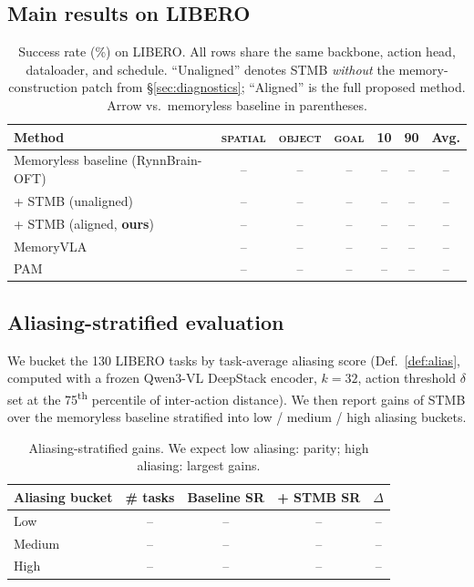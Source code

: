 \documentclass[11pt]{article}
\newcommand{\num}{--} %
\begin{document}
\subsection{Main results on LIBERO}

\begin{table}[h]
\centering
\caption{Success rate (\%) on LIBERO. All rows share the same backbone, action
head, dataloader, and schedule. ``Unaligned'' denotes STMB \emph{without} the
memory-construction patch from \S\ref{sec:diagnostics}; ``Aligned'' is the full
proposed method. Arrow vs.~memoryless baseline in parentheses.}
\label{tab:libero}
\small
\begin{tabular}{lcccccc}
\toprule
Method & \textsc{spatial} & \textsc{object} & \textsc{goal} & \textsc{10} & \textsc{90} & Avg. \\
\midrule
Memoryless baseline (RynnBrain-OFT)    & \num & \num & \num & \num & \num & \num \\
\quad + STMB (unaligned)               & \num & \num & \num & \num & \num & \num \\
\quad + STMB (aligned, \textbf{ours})  & \num & \num & \num & \num & \num & \num \\
\midrule
MemoryVLA~\cite{shi2025memoryvla}      & \num & \num & \num & \num & \num & \num \\
PAM~\cite{pam2025}                     & \num & \num & \num & \num & \num & \num \\
\bottomrule
\end{tabular}
\end{table}

\subsection{Aliasing-stratified evaluation}
\label{sec:exp-alias}

We bucket the 130 LIBERO tasks by task-average aliasing score
(Def.~\ref{def:alias}, computed with a frozen Qwen3-VL DeepStack encoder, $k{=}32$,
action threshold $\delta$ set at the 75\textsuperscript{th} percentile of
inter-action distance). We then report gains of STMB over the memoryless
baseline stratified into low / medium / high aliasing buckets.

\begin{table}[h]
\centering
\caption{Aliasing-stratified gains. We expect low aliasing: parity; high
aliasing: largest gains.}
\label{tab:alias-bucket}
\small
\begin{tabular}{lcccc}
\toprule
Aliasing bucket & \# tasks & Baseline SR & + STMB SR & $\Delta$ \\
\midrule
Low    & \num & \num & \num & \num \\
Medium & \num & \num & \num & \num \\
High   & \num & \num & \num & \num \\
\bottomrule
\end{tabular}
\end{table}
\end{document}
